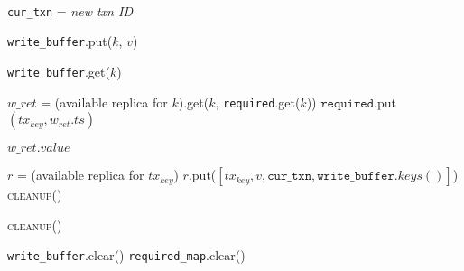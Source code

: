 \begin{algorithm}[t!]
\begin{addmargin}[-1em]{0em}
\begin{algorithmic}
  \\


  \State \texttt{cur\_txn} = \textit{new txn ID} 
  \EndProcedure\vspace{.5em}

  \State \texttt{write\_buffer}.put($k$, $v$)
\EndProcedure\vspace{.5em}

  \State \Return \texttt{write\_buffer}.get($k$) 
  \EndIf

  \State $w\_{ret}$ = (available replica for $k$).get($k$, \texttt{required}.get($k$))
  \State $\texttt{required}$.put$(tx_{key}, w_{ret}.ts)$
  \EndIf
  \EndFor

  \State \Return $w\_{ret}.value$
\EndProcedure\vspace{.5em}


 \State $r$ = (available replica for $tx_{key}$)
 \State $r$.put($[tx_{key}, v, \texttt{cur\_txn}, \texttt{write\_buffer}.keys()]$)
 \EndFor
  \State \textsc{cleanup()}
\EndProcedure\vspace{.5em}


  \State \textsc{cleanup()}
\EndProcedure\vspace{.5em}


  \State \texttt{write\_buffer}.clear()
  \State \texttt{required\_map}.clear()
\EndProcedure\vspace{.5em}


\end{algorithmic}
\end{addmargin}
\end{algorithm}
